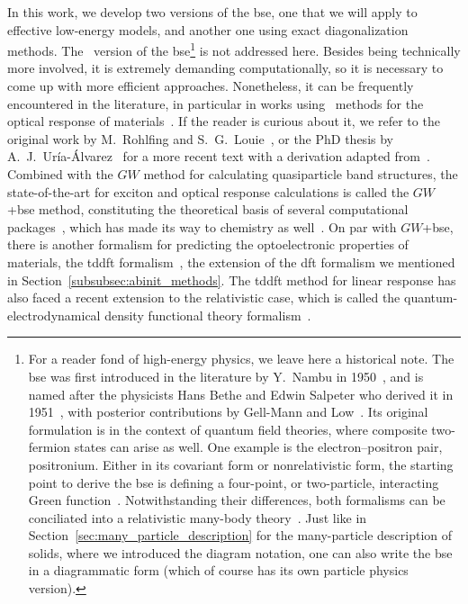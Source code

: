 In this work, we develop two versions of the \gls{bse}\@, one that we will apply to effective low-energy models, and another one using exact diagonalization methods.
The \abinit~version of the \gls{bse}\footnote{For a reader fond of high-energy physics, we leave here a historical note. The \gls{bse} was first introduced in the literature by Y.~Nambu in 1950~\cite{Nambu_1950}, and is named after the physicists Hans Bethe and Edwin Salpeter who derived it in 1951~\cite{Bethe_Salpeter_1951}, with posterior contributions by Gell-Mann and Low~\cite{Gell-Mann_Low_1951}. Its original formulation is in the context of quantum field theories, where composite two-fermion states can arise as well. One example is the electron--positron pair, positronium. Either in its covariant form or nonrelativistic form, the starting point to derive the \gls{bse} is defining a four-point, or two-particle, interacting Green function~\cite{Gell-Mann_Low_1951,Martin_Reining_Ceperley_2016}. Notwithstanding their differences, both formalisms can be conciliated into a relativistic many-body theory~\cite{Lindgren_2011}. Just like in Section~\ref{sec:many_particle_description} for the many-particle description of solids, where we introduced the diagram notation, one can also write the \gls{bse} in a diagrammatic form (which of course has its own particle physics version).} is not addressed here.
Besides being technically more involved, it is extremely demanding computationally, so it is necessary to come up with more efficient approaches.
Nonetheless, it can be frequently encountered in the literature, in particular in works using \abinit~methods for the optical response of materials~\cite{BerkeleyGW,Yambo_2009}.
If the reader is curious about it, we refer to the original work by M.~Rohlfing and S.~G.~Louie~\cite{Louie_2000}, or the PhD thesis by A.~J.~Ur\'ia-\'Alvarez~\cite{Alex_PhD} for a more recent text with a derivation adapted from~\cite{Louie_2000}.
Combined with the $GW$ method for calculating quasiparticle band structures, the state-of-the-art for exciton and optical response calculations is called the $GW$+\gls{bse} method, constituting the theoretical basis of several computational packages~\cite{Yambo_2009,BerkeleyGW,Perfetto_Stefanucci_2018,Vorwerk_Aurich_Cocchi_Draxl_2019,GPAW_2025}, which has made its way to chemistry as well~\cite{Blase_2020,Amblard_Blase_Duchemin_2023,Amblard_Blase_Duchemin_2024,TURBOMOLE_2013,TURBOMOLE_2023}.
On par with $GW$+\gls{bse}, there is another formalism for predicting the optoelectronic properties of materials, the \gls{tddft} formalism~\cite{Runge_Gross_1984,Rubio_2002}, the extension of the \gls{dft} formalism we mentioned in Section~\ref{subsubsec:abinit_methods}.
The \gls{tddft} method for linear response has also faced a recent extension to the relativistic case, which is called the quantum-electrodynamical density functional theory formalism~\cite{Ruggenthaler_2025}.

